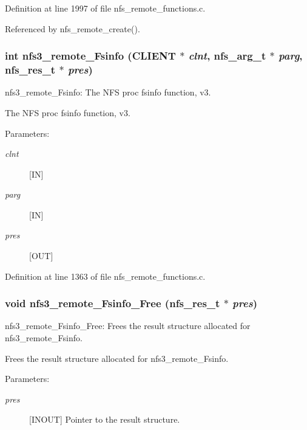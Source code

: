 Definition at line 1997 of file nfs\_\-remote\_\-functions.c.

Referenced by nfs\_\-remote\_\-create().
\subsubsection{\setlength{\rightskip}{0pt plus 5cm}int nfs3\_\-remote\_\-Fsinfo (CLIENT $\ast$ {\em clnt}, nfs\_\-arg\_\-t $\ast$ {\em parg}, nfs\_\-res\_\-t $\ast$ {\em pres})}\label{group__NFSprocs_ga36}


nfs3\_\-remote\_\-Fsinfo: The NFS proc fsinfo function, v3.

The NFS proc fsinfo function, v3.

\begin{Desc}
\item[Parameters:]
\begin{description}
\item[{\em clnt}][IN] \item[{\em parg}][IN] \item[{\em pres}][OUT] \end{description}
\end{Desc}


Definition at line 1363 of file nfs\_\-remote\_\-functions.c.
\subsubsection{\setlength{\rightskip}{0pt plus 5cm}void nfs3\_\-remote\_\-Fsinfo\_\-Free (nfs\_\-res\_\-t $\ast$ {\em pres})}\label{group__NFSprocs_ga90}


nfs3\_\-remote\_\-Fsinfo\_\-Free: Frees the result structure allocated for nfs3\_\-remote\_\-Fsinfo.

Frees the result structure allocated for nfs3\_\-remote\_\-Fsinfo.

\begin{Desc}
\item[Parameters:]
\begin{description}
\item[{\em pres}][INOUT] Pointer to the result structure. \end{description}
\end{Desc}


